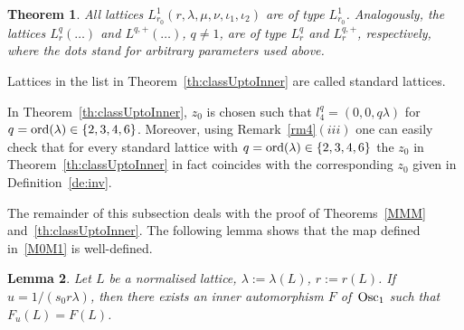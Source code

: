 \documentclass[pdftex]{sigma}
\newcommand{\Osc}{{\rm Osc}}
\newcommand{\ord}{{\rm ord}}
\numberwithin{equation}{section}
\newtheorem{Theorem}{Theorem}[section]
\newtheorem{Lemma}[Theorem]{Lemma}
\begin{document}
\begin{Theorem}
All lattices $L^1_{r_0}(r,\lambda,\mu,\nu,\iota_1,\iota_2)$ are of type $L^1_{r_0}$. Analogously, the lattices $L^q_r(\dots)$ and $L^{q,+}(\dots)$, $q\not=1$, are of type $L^q_r$ and $L^{q,+}_r$, respectively, where the dots stand for arbitrary parameters used above.
\end{Theorem}

\begin{Definition}
Lattices in the list in Theorem~\ref{th:classUptoInner} are called standard lattices.
\end{Definition}

\begin{Remark}\label{z0}
In Theorem~\ref{th:classUptoInner}, $z_0$ is chosen such that $l_4^q=(0,0,q\lambda)$ for $q=\ord(\lambda)\in\{2,3,4,6\}$. Moreover, using Remark~\ref{rm4}$(iii)$ one can easily check that for every standard lattice with $q=\ord(\lambda)\in\{2,3,4,6\}$ the $z_0$ in Theorem~\ref{th:classUptoInner} in fact coincides with the corresponding $z_0$ given in Definition~\ref{de:inv}.
\end{Remark}
%
The remainder of this subsection deals with the proof of Theorems~\ref{MMM} and~\ref{th:classUptoInner}. The following lemma shows that the map defined in~\eqref{M0M1} is well-defined.
%
\begin{Lemma}\label{pr:shift}
Let $L$ be a normalised lattice, $\lambda:=\lambda(L)$, $r:=r(L)$. If~$u=1/(s_0r\lambda)$, then there exists an inner automorphism $F$ of~$\Osc_1$ such that $F_u (L)=F(L)$.
\end{Lemma}
\end{document}
